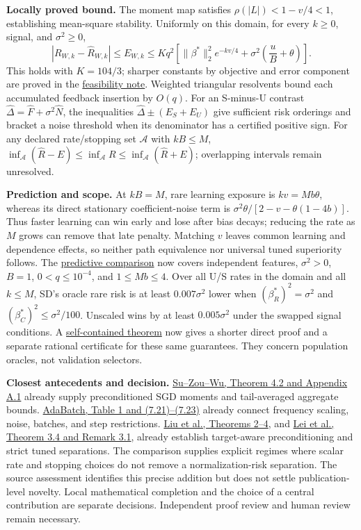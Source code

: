\documentclass[10pt,a4paper]{article}
\begin{document}
\textbf{Locally proved bound.} The moment map satisfies
$\rho(|L|) < 1 - v/4 < 1$, establishing mean-square stability. Uniformly on this
domain, for every $k \geq 0$, signal, and $\sigma^2 \geq 0$,
\[
  |R_{W,k} - \widehat R_{W,k}|
  \leq E_{W,k}
  \leq Kq^2\!\left[ \|\beta^*\|_2^2 e^{-kv/4} + \sigma^2\left( \frac{u}{B} + \theta \right) \right].
\]
This holds with $K = 104/3$; sharper constants by objective and error component
are proved in the
\href{../notes/predictive-claim-feasibility.md}{feasibility note}. Weighted
triangular resolvents bound each accumulated feedback insertion by $O(q)$. For
an S-minus-U contrast $\widehat\Delta = \widehat F + \sigma^2\widehat N$, the
inequalities $\widehat\Delta \pm (E_S + E_U)$ give sufficient risk orderings and
bracket a noise threshold when its denominator has a certified positive sign.
For any declared rate/stopping set $\mathcal A$ with $kB \leq M$,
$\inf_{\mathcal A}(\widehat R - E) \leq \inf_{\mathcal A}R \leq \inf_{\mathcal A}(\widehat R + E)$;
overlapping intervals remain unresolved.

\textbf{Prediction and scope.} At $kB = M$, rare learning exposure is
$kv = Mb\theta$, whereas its direct stationary coefficient-noise term is
$\sigma^2\theta/[2 - v - \theta(1 - 4b)]$. Thus faster learning can win early
and lose after bias decays; reducing the rate as $M$ grows can remove that late
penalty. Matching $v$ leaves common learning and dependence effects, so neither
path equivalence nor universal tuned superiority follows. The
\href{../notes/predictive-regime.md}{predictive comparison} now covers
independent features, $\sigma^2 > 0$, $B = 1$, $0 < q \leq 10^{-4}$, and
$1 \leq Mb \leq 4$. Over all U/S rates in the domain and all $k \leq M$, SD's
oracle rare risk is at least $0.007\sigma^2$ lower when
$(\beta_R^*)^2 = \sigma^2$ and $(\beta_C^*)^2 \leq \sigma^2/100$. Unscaled wins
by at least $0.005\sigma^2$ under the swapped signal conditions. A
\href{../notes/predictive-theorem.md}{self-contained theorem} now gives a
shorter direct proof and a separate rational certificate for these same
guarantees. They concern population oracles, not validation selectors.

\textbf{Closest antecedents and decision.}
\href{https://arxiv.org/html/2403.08585v3}{Su--Zou--Wu, Theorem 4.2 and Appendix
  A.1}
already supply preconditioned SGD moments and tail-averaged aggregate bounds.
\href{https://arxiv.org/html/1711.01761v1}{AdaBatch, Table 1 and (7.21)--(7.23)}
already connect frequency scaling, noise, batches, and step restrictions.
\href{https://arxiv.org/html/2502.09047v1}{Liu et al., Theorems 2--4}, and
\href{https://proceedings.mlr.press/v139/lei21a/lei21a.pdf}{Lei et al., Theorem
  3.4 and Remark 3.1},
already establish target-aware preconditioning and strict tuned separations. The
comparison supplies explicit regimes where scalar rate and stopping choices do
not remove a normalization-risk separation. The source assessment identifies
this precise addition but does not settle publication-level novelty. Local
mathematical completion and the choice of a central contribution are separate
decisions. Independent proof review and human review remain necessary.
\end{document}
